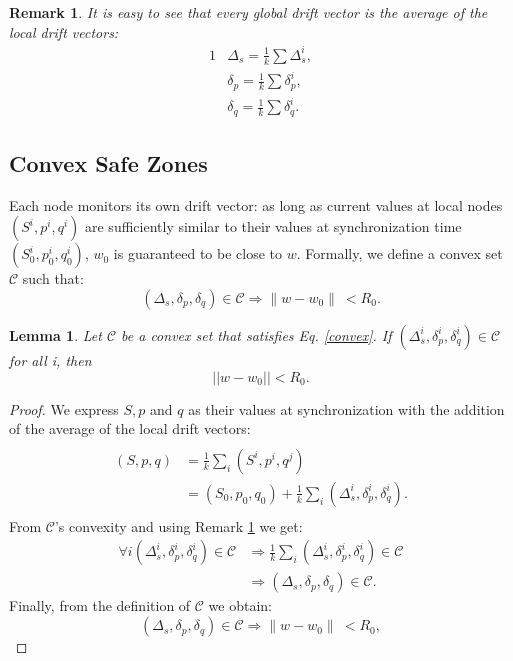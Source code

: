 \documentclass{vldb}
\newtheorem{remark}{Remark}
\newtheorem{lemma}{Lemma}
\begin{document}
\begin{remark} \label{average}
It is easy to see that every global drift vector is the average of the local drift vectors:
\begin{alignat*}{1}
& \Delta_s = \frac{1}{k} \sum \Delta_s^i, \\
& \delta_p = \frac{1}{k} \sum \delta_p^i, \\
& \delta_q = \frac{1}{k} \sum \delta_q^i.
\end{alignat*}

\end{remark}

\subsection{Convex Safe Zones}
Each node monitors its own drift vector: as long as current values
at local nodes $(S^i,p^i,q^i)$ are sufficiently similar to their values
at synchronization time $(S^i_0,p^i_0,q^i_0)$, $w_0$ is guaranteed to be close to $w$.
Formally, we define a convex set $\mathcal{C}$ such that:
\begin{equation} \label{convex}
(\Delta_s, \delta_p, \delta_q) \in \mathcal{C} \Rightarrow \parallel w-w_0
\parallel \ < R_0.
\end{equation}
\begin{lemma} \label{averages}
Let $\mathcal{C}$ be a convex set that satisfies Eq. \ref{convex}.
If $(\Delta_s^i, \delta_p^i, \delta_q^i) \in \mathcal{C}$ for all i, then
\begin{equation*}
||w-w_0|| < R_0.
\end{equation*}
\end{lemma}
\begin{proof}
We express $S, p$ and $q$ as their values at synchronization with the addition of the average of the local drift vectors:
\begin{equation}
\begin{split}
\\(S,p,q) & = \frac{1}{k} \sum_i (S^i,p^i,q^j) \\
 & = (S_0,p_0,q_0) + \frac{1}{k} \sum_i (\Delta_s^i,\delta^i_p,\delta_q^i). \\
\end{split}
\end{equation}
From $\mathcal{C}$'s convexity and using Remark \ref{average} we get:
\begin{equation}
\begin{split}
\forall i (\Delta_s^i,\delta^i_p,\delta_q^i) \in \mathcal{C} & \Rightarrow
\frac{1}{k} \sum_i (\Delta_s^i,\delta^i_p,\delta_q^i) \in \mathcal{C} \\
& \Rightarrow (\Delta_s,\delta_p,\delta_q) \in \mathcal{C}.
\end{split}
\end{equation}
Finally, from the definition of $\mathcal{C}$ we obtain:
\begin{equation}
(\Delta_s,\delta_p,\delta_q) \in \mathcal{C} \Rightarrow \parallel w-w_0
\parallel \ < R_0,
\end{equation}
\end{proof}
\end{document}
